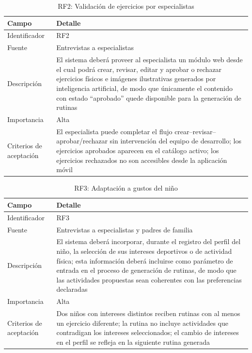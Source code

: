 					\begin{table}[H]
						\centering\small
						\caption{RF2: Validación de ejercicios por especialistas}
						\label{tab:rf2}
						\begin{tabular}{p{3.5cm}p{11cm}}
							\hline
							\textbf{Campo} & \textbf{Detalle} \\
							\hline
							Identificador & RF2 \\
							
							Fuente & Entrevistas a especialistas \\
							
							Descripción & El sistema deberá proveer al especialista un módulo web desde el cual podrá crear, revisar, editar y aprobar o rechazar ejercicios físicos e imágenes ilustrativas generados por inteligencia artificial, de modo que únicamente el contenido con estado ``aprobado'' quede disponible para la generación de rutinas \\
							
							Importancia & Alta \\
							
							Criterios de aceptación & El especialista puede completar el flujo crear--revisar--aprobar/rechazar sin intervención del equipo de desarrollo; los ejercicios aprobados aparecen en el catálogo activo; los ejercicios rechazados no son accesibles desde la aplicación móvil \\
							\hline
						\end{tabular}
					\end{table} \tblnote
					
					\begin{table}[H]
						\centering\small
						\caption{RF3: Adaptación a gustos del niño}
						\label{tab:rf3}
						\begin{tabular}{p{3.5cm}p{11cm}}
							\hline
							\textbf{Campo} & \textbf{Detalle} \\
							\hline
							Identificador & RF3 \\
							
							Fuente & Entrevistas a especialistas y padres de familia \\
							
							Descripción & El sistema deberá incorporar, durante el registro del perfil del niño, la selección de sus intereses deportivos o de actividad física; esta información deberá incluirse como parámetro de entrada en el proceso de generación de rutinas, de modo que las actividades propuestas sean coherentes con las preferencias declaradas \\
							
							Importancia & Alta \\
							
							Criterios de aceptación & Dos niños con intereses distintos reciben rutinas con al menos un ejercicio diferente; la rutina no incluye actividades que contradigan los intereses seleccionados; el cambio de intereses en el perfil se refleja en la siguiente rutina generada \\
							\hline
						\end{tabular}
					\end{table} \tblnote
					
